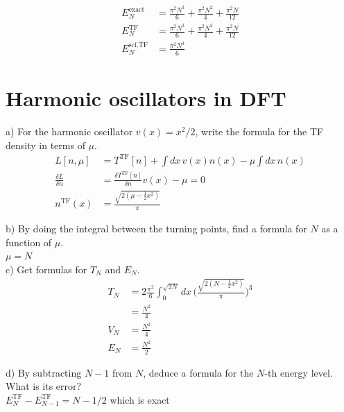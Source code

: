 \documentclass{article}
\begin{document}
{\color{blue}
  \begin{align}
    E_N^{\text{exact}} & = \frac{\pi^2N^3}{6} + \frac{\pi^2N^2}{4} + \frac{\pi^2N}{12} \\
    E_N^{\text{TF}} & = \frac{\pi^2N^3}{6} + \frac{\pi^2N^2}{4} + \frac{\pi^2N}{12} \\
    E_N^{\text{scf,TF}} & = \frac{\pi^2N^3}{6}
  \end{align}
}

\pagebreak

\section*{Harmonic oscillators in DFT}

\noindent a) For the harmonic oscillator $v(x)=x^2/2$, write the formula for
the TF density in terms of $\mu$.
{\color{blue}
  \begin{align}
    L[n,\mu] & = T^{\text{TF}}[n] + \int dx\, v(x)n(x) -\mu\int dx\, n(x)\\
    \frac{\delta L}{\delta n} & = \frac{\delta T^{\text{TF}}[n]}{\delta n}
      v(x) - \mu = 0 \\
    n^{\text{TF}}(x) & = \frac{\sqrt{2(\mu-\frac{1}{2}x^2)}}{\pi}
  \end{align}
}

\noindent b) By doing the integral between the turning points, find a formula
for $N$ as a function of $\mu$.
\\

{\color{blue} $\mu = N$}
\\

\noindent c) Get formulas for $T_N$ and $E_N$.    
{\color{blue}
  \begin{align*}
  T_N & = 2\frac{\pi^2}{6}\int_0^{\sqrt{2N}}dx\,
  \Bigg(\frac{\sqrt{2(N-\frac{1}{2}x^2)}}{\pi}\Bigg)^3 \\
  & = \frac{N^2}{4} \\
  V_N & = \frac{N^2}{4} \\
  E_N & = \frac{N^2}{2}
  \end{align*}
}

\noindent d) By subtracting $N-1$ from $N$, deduce a formula for the $N$-th
energy level.  What is its error?
\\

{\color{blue} $E^{\text{TF}}_N - E^{\text{TF}}_{N-1} = N-1/2$ which is exact}
\\
\end{document}
